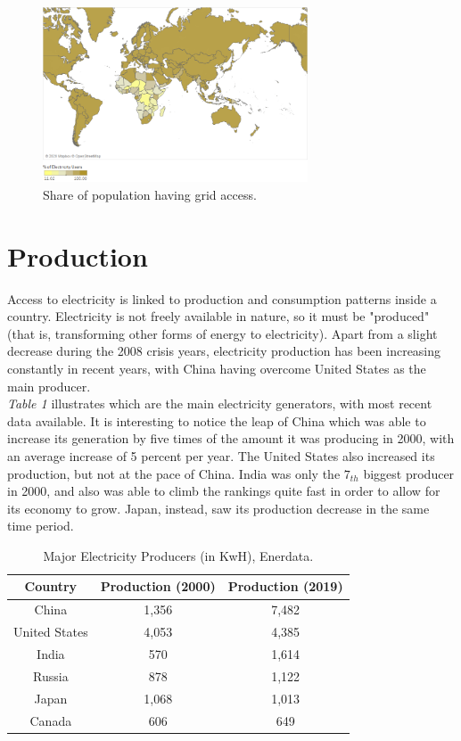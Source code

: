 \documentclass{book}
\begin{document}
\bigskip
\begin{figure}[H]
\begin{center}
\captionsetup{justification=centering}
\includegraphics[width=0.7\textwidth]{Images/access.png}
\caption{Share of population having grid access. }
\end{center}
\end{figure}
\bigskip

\section{Production}

Access to electricity is linked to production and consumption patterns inside a country. Electricity is not freely available in nature, so it must be "produced" (that is, transforming other forms of energy to electricity). Apart from a slight decrease during the 2008 crisis years, electricity production has been increasing constantly in recent years, with China having overcome United States as the main producer.\\

\textit{Table 1} illustrates which are the main electricity generators, with most recent data available. It is interesting to notice the leap of China which was able to increase its generation by five times of the amount it was producing in 2000, with an average increase of 5 percent per year. The United States also increased its production, but not at the pace of China. India was only the $7_{th}$ biggest producer in 2000, and also was able to climb the rankings quite fast in order to allow for its economy to grow. Japan, instead, saw its production decrease in the same time period.

\bigskip
\begin{table}[H]
\begin{center}
\begin{tabular}{|c|c|c|}
\hline
Country & Production (2000) & Production (2019)\\
\hline
China & 1,356 & 7,482\\
United States & 4,053 & 4,385\\
India & 570 & 1,614\\
Russia & 878 & 1,122\\
Japan & 1,068 & 1,013\\
Canada & 606 & 649\\
\hline
\end{tabular}
\caption{Major Electricity Producers (in KwH), Enerdata.}
\end{center}
\end{table}
\end{document}
